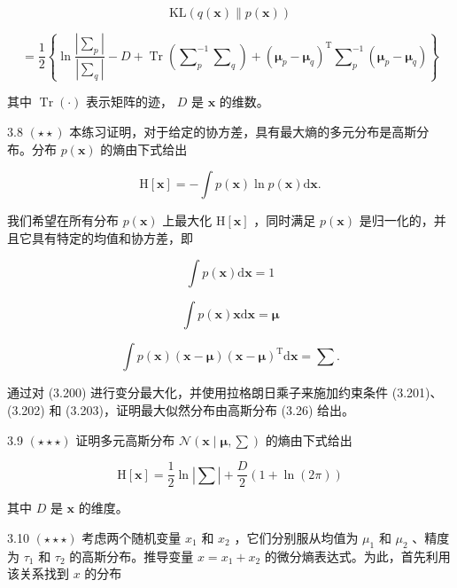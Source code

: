 \documentclass[10pt]{report}
\begin{document}
\[
\mathrm{{KL}}\left( {q\left( \mathbf{x}\right) \parallel p\left( \mathbf{x}\right) }\right)
\]

\[
= \frac{1}{2}\left\{  {\ln \frac{\left| {\mathbf{\sum }}_{p}\right| }{\left| {\mathbf{\sum }}_{q}\right| } - D + \operatorname{Tr}\left( {{\mathbf{\sum }}_{p}^{-1}{\mathbf{\sum }}_{q}}\right)  + {\left( {\mathbf{\mu }}_{p} - {\mathbf{\mu }}_{q}\right) }^{\mathrm{T}}{\mathbf{\sum }}_{p}^{-1}\left( {{\mathbf{\mu }}_{p} - {\mathbf{\mu }}_{q}}\right) }\right\}   \tag{3.199}
\]

其中 \(\operatorname{Tr}\left( \cdot \right)\) 表示矩阵的迹， \(D\) 是 \(\mathbf{x}\) 的维数。

3.8 \(\left( {\star  \star  }\right)\) 本练习证明，对于给定的协方差，具有最大熵的多元分布是高斯分布。分布 \(p\left( \mathbf{x}\right)\) 的熵由下式给出

\[
\mathrm{H}\left\lbrack  \mathbf{x}\right\rbrack   =  - \int p\left( \mathbf{x}\right) \ln p\left( \mathbf{x}\right) \mathrm{d}\mathbf{x}. \tag{3.200}
\]

我们希望在所有分布 \(p\left( \mathbf{x}\right)\) 上最大化 \(\mathrm{H}\left\lbrack  \mathbf{x}\right\rbrack\) ，同时满足 \(p\left( \mathbf{x}\right)\) 是归一化的，并且它具有特定的均值和协方差，即

\[
\int p\left( \mathbf{x}\right) \mathrm{d}\mathbf{x} = 1 \tag{3.201}
\]

\[
\int p\left( \mathbf{x}\right) \mathbf{x}\mathrm{d}\mathbf{x} = \mathbf{\mu } \tag{3.202}
\]

\[
\int p\left( \mathbf{x}\right) \left( {\mathbf{x} - \mathbf{\mu }}\right) {\left( \mathbf{x} - \mathbf{\mu }\right) }^{\mathrm{T}}\mathrm{d}\mathbf{x} = \mathbf{\sum }. \tag{3.203}
\]

通过对 (3.200) 进行变分最大化，并使用拉格朗日乘子来施加约束条件 (3.201)、(3.202) 和 (3.203)，证明最大似然分布由高斯分布 (3.26) 给出。

3.9 \(\left( {\star  \star   \star  }\right)\) 证明多元高斯分布 \(\mathcal{N}\left( {\mathbf{x} \mid  \mathbf{\mu },\mathbf{\sum }}\right)\) 的熵由下式给出

\[
\mathrm{H}\left\lbrack  \mathbf{x}\right\rbrack   = \frac{1}{2}\ln \left| \mathbf{\sum }\right|  + \frac{D}{2}\left( {1 + \ln \left( {2\pi }\right) }\right)  \tag{3.204}
\]

其中 \(D\) 是 \(\mathbf{x}\) 的维度。

3.10 \(\left( {\star  \star   \star  }\right)\) 考虑两个随机变量 \({x}_{1}\) 和 \({x}_{2}\) ，它们分别服从均值为 \({\mu }_{1}\) 和 \({\mu }_{2}\) 、精度为 \({\tau }_{1}\) 和 \({\tau }_{2}\) 的高斯分布。推导变量 \(x = {x}_{1} + {x}_{2}\) 的微分熵表达式。为此，首先利用该关系找到 \(x\) 的分布
\end{document}
